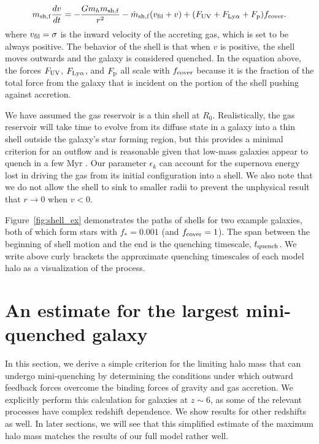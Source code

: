 \documentclass[a4paper,11pt]{article}
\begin{document}
\begin{equation}
        m_{\rm sh, f} \frac{dv}{dt}  = -\frac{G m_{h} m_{\rm sh, f}}{r^{2}} - \dot{m}_{\rm sh, f} (v_{\rm fil} + v) + (F_{\rm UV} + F_{\rm Ly\alpha} + F_{\rm p}) f_{\rm cover}. \label{eq:shell}
\end{equation}
%
where $v_{\rm fil} = \sigma$ is the inward velocity of the accreting gas, which is set to be always positive. The behavior of the shell is that when $v$ is positive, the shell moves outwards and the galaxy is considered quenched. In the equation above, the forces $F_{\rm UV}$, $F_{\rm Ly\alpha}$, and $F_{\rm p}$ all scale with $f_{\rm cover}$ because it is the fraction of the total force from the galaxy that is incident on the portion of the shell pushing against accretion. 

We have assumed the gas reservoir is a thin shell at $R_{0}$. Realistically, the gas reservoir will take time to evolve from its diffuse state in a galaxy into a thin shell outside the galaxy's star forming region, but this provides a minimal criterion for an outflow and is reasonable given that low-mass galaxies appear to quench in a few Myr \cite{Gelli2023}. Our parameter $\epsilon_k$ can account for the supernova energy lost in driving the gas from its initial configuration into a shell. We also note that we do not allow the shell to sink to smaller radii to prevent the unphysical result that $r \rightarrow 0$ when $v < 0$. 

Figure~\ref{fig:shell_ex} demonstrates the paths of shells for two example galaxies, both of which form stars with $f_{*} = 0.001$ (and $f_{\rm cover} = 1$). The span between the beginning of shell motion and the end is the quenching timescale, $t_{\rm quench}$. We write above curly brackets the approximate quenching timescales of each model halo as a visualization of the process.

\section{An estimate for the largest mini-quenched galaxy} \label{sec:approx}

In this section, we derive a simple criterion for the limiting halo mass that can undergo mini-quenching by determining the conditions under which outward feedback forces overcome the binding forces of gravity and gas accretion. We explicitly perform this calculation for galaxies at $z \sim 6$, as some of the relevant processes have complex redshift dependence. We show results for other redshifts as well. In later sections, we will see that this simplified estimate of the maximum halo mass matches the results of our full model rather well.
\end{document}
